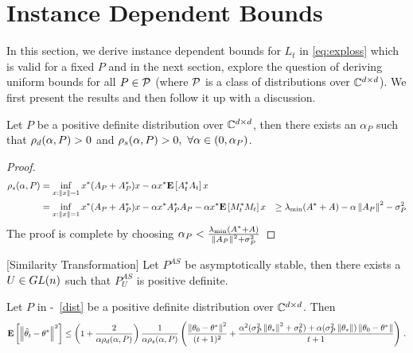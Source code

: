 \section{Instance Dependent Bounds}
In this section, we derive instance dependent bounds for $L_t$ in \eqref{eq:exploss} which is valid for a fixed $P$ and in the next section, explore the question of deriving uniform bounds for all $P\in \P$ (where $\P$ is a class of distributions over $\C^{\dcd}$). We first present the results and then follow it up with a discussion.
\begin{lemma}\label{lm:pd}
Let $P$ be a positive definite distribution over $\C^{\dcd}$, then there exists an $\alpha_P$ such that $\rhod{P}>0$ and $\rhos{P}>0,~\forall \alpha \in (0,\alpha_P)$.
\end{lemma}
\begin{proof}
\begin{align*}
\rhos{P}&=\inf_{x:\norm{x}=1}x^* (A_P+A_P^*)x -\alpha x^*\EE{A_t^* A_t} x\\
&=\inf_{x:\norm{x}=1}x^* (A_P+A_P^*)x -\alpha x^* A^*_P A_P -\alpha x^* \EE{M_t^* M_t} x
&\geq \lambda_{\min}(A^*+A)-\alpha \norm{A_P}^2-\sigma^2_P
\end{align*}
The proof is complete by choosing $\alpha_P<\frac{\lambda_{\min}(A^*+A)}{\norm{A_P}^2+\sigma^2_P}$
\end{proof}

\begin{lemma}\label{lm:simtran}[Similarity Transformation]
Let $P^{AS}$ be asymptotically stable, then there exists a $U\in \gln$ such that $P^{AS}_U$ is positive definite.
\end{lemma}

\begin{theorem}\label{th:pdrate}
Let $P$ in -~\ref{dist} be a positive definite distribution over $\C^{\dcd}$. Then
\begin{align}
\EE{\norm{\thh_t-\theta^*}^2}
\leq
\left(1+\frac2{\alpha\rhod{P}}\right)\frac{1}{\alpha \rhos{P}}
\left(\frac{\norm{\theta_0-\theta^*}^2}{(t+1)^2}+ \frac{\alpha^2(\sigma_P^2\norm{\ts}^2+\sigma_b^2)+\alpha (\sigma_P^2\norm{\ts})\norm{\theta_0-\theta^*}}{t+1} \right)\,.
\end{align}

\end{theorem}


